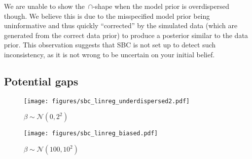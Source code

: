 \documentclass[twoside]{article}
\begin{document}
\begin{figure*}
\label{fig:sbc_linreg_different_beta}
\vspace*{-6pt}
\end{figure*}

We are unable to show the~{$\cap$-shape} when the model prior is overdispersed though. We believe this is due to the misspecified model prior being uninformative and thus quickly ``corrected'' by the simulated data (which are generated from the correct data prior) to produce a posterior similar to the data prior. This observation suggests that SBC is not set up to detect such inconsistency, as it is not wrong to be uncertain on your initial belief.

\subsection{Potential gaps}

\begin{figure*}
\vspace*{-7pt}
\begin{center}
\begin{subfigure}[t]{.48\textwidth}
  \texttt{[image: figures/sbc\_linreg\_underdispersed2.pdf]}
  \vspace*{-12pt}
  \caption{$\beta \sim \mathcal{N}(0, 2^2)$}
  \label{fig:sbc_linreg_underdispersed2}
\end{subfigure}
\hspace*{.001\textwidth}
\begin{subfigure}[t]{.48\textwidth}
  \texttt{[image: figures/sbc\_linreg\_biased.pdf]}
  \vspace*{-12pt}
  \caption{$\beta \sim \mathcal{N}(100, 10^2)$}
  \label{fig:sbc_linreg_biased}
\end{subfigure}
\end{center}
\vspace*{-7pt}
\caption{The rank distributions under Simulation-Based Calibration (SBC) for all parameters, when one parameter of the prior used to build our posterior (model prior) is different to the one used to generate the data (data prior). We define the data generating process as that in Figure~\ref{fig:sbc_linreg_different_beta}, and modify the model prior by only changing the distribution of~$\beta$ as shown in the sub-captions. One would expect the histograms for $\alpha$ show the ranks are uniformly distributed, but that is not the case.}
\label{fig:sbc_linreg_different}
\end{figure*}
\end{document}

